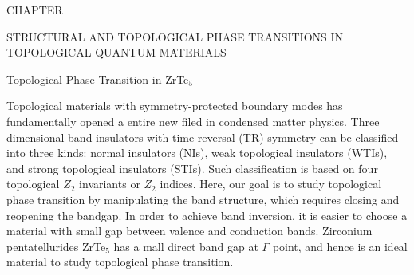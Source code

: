     
    \pagebreak

    
    \addtocounter{numch}{1}
	{\centering
		\vspace{0pt} \hspace{0pt} \par
	}
	{\centering
		\vspace{56pt} CHAPTER  \the\value{numch}
	}
	{\centering\singlespacing
		STRUCTURAL AND TOPOLOGICAL PHASE TRANSITIONS IN TOPOLOGICAL QUANTUM MATERIALS
	    \par
	}
	{\centering
		\vspace{0pt} \hspace{0pt} \par
	}
	

    
	{\centering
		\vspace{12pt} Topological Phase Transition in ZrTe$_5$
	    \par
	}
Topological materials with symmetry-protected boundary modes has fundamentally opened a entire new filed in condensed matter physics. Three dimensional band insulators with time-reversal (TR) symmetry can be classified into three kinds: normal insulators (NIs), weak topological insulators (WTIs), and strong topological insulators (STIs). Such classification is based on four topological $Z_2$  invariants or $Z_2$ indices. Here, our goal is to study topological phase transition by manipulating the band structure, which requires closing and reopening the bandgap. In order to achieve band inversion, it is easier to choose a material with small gap between valence and conduction bands. Zirconium pentatellurides ZrTe$_5$ has a mall direct band gap at $\Gamma$ point, and hence is an ideal material to study topological phase transition.

